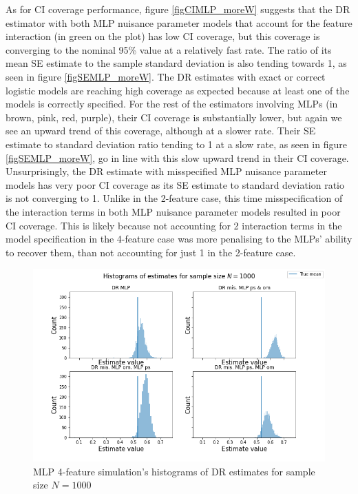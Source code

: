 \documentclass[12pt,twoside]{article}
\begin{document}
As for CI coverage performance, figure \ref{figCIMLP_moreW} suggests that the DR estimator with both MLP nuisance parameter models that account for the feature interaction (in green on the plot) has low CI coverage, but this coverage is converging to the nominal 95\% value at a relatively fast rate. The ratio of its mean SE estimate to the sample standard deviation is also tending towards 1, as seen in figure \ref{figSEMLP_moreW}. The DR estimates with exact or correct logistic models are reaching high coverage as expected because at least one of the models is correctly specified. For the rest of the estimators involving MLPs (in brown, pink, red, purple), their CI coverage is substantially lower, but again we see an upward trend of this coverage, although at a slower rate. Their SE estimate to standard deviation ratio tending to 1 at a slow rate, as seen in figure \ref{figSEMLP_moreW}, go in line with this slow upward trend in their CI coverage. Unsurprisingly, the DR estimate with misspecified MLP nuisance parameter models has very poor CI coverage as its SE estimate to standard deviation ratio is not converging to 1. Unlike in the 2-feature case, this time misspecification of the interaction terms in both MLP nuisance parameter models resulted in poor CI coverage. This is likely because not accounting for 2 interaction terms in the model specification in the 4-feature case was more penalising to the MLPs' ability to recover them, than not accounting for just 1 in the 2-feature case.

\begin{figure}[h!]
    \centering
    \includegraphics[width = 0.9\columnwidth]{figures/histMLP_moreW.png}
    \caption{MLP 4-feature simulation's histograms of DR estimates for sample size $N = 1000$}
    \label{fighistMLP_moreW}
\end{figure}
\end{document}
